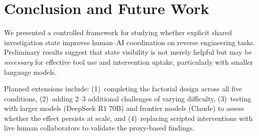 \documentclass[letterpaper]{article}
\begin{document}
\section{Conclusion and Future Work}

We presented a controlled framework for studying whether explicit shared investigation state improves human--AI coordination on reverse engineering tasks.
Preliminary results suggest that state visibility is not merely helpful but may be \emph{necessary} for effective tool use and intervention uptake, particularly with smaller language models.

Planned extensions include: (1)~completing the factorial design across all five conditions, (2)~adding 2--3 additional challenges of varying difficulty, (3)~testing with larger models (DeepSeek R1 70B) and frontier models (Claude) to assess whether the effect persists at scale, and (4)~replacing scripted interventions with live human collaborators to validate the proxy-based findings.



\end{document}
